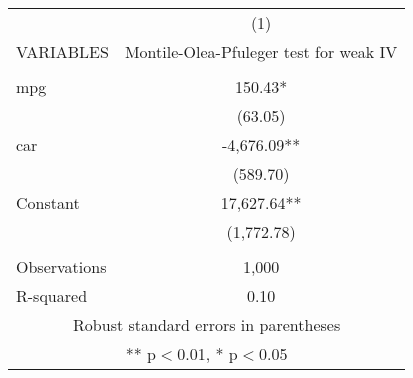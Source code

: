 \begin{tabular}{lc} \hline
 & (1) \\
VARIABLES & Montile-Olea-Pfuleger test for weak IV \\ \hline
 &  \\
mpg & 150.43* \\
 & (63.05) \\
car & -4,676.09** \\
 & (589.70) \\
Constant & 17,627.64** \\
 & (1,772.78) \\
 &  \\
Observations & 1,000 \\
 R-squared & 0.10 \\ \hline
\multicolumn{2}{c}{ Robust standard errors in parentheses} \\
\multicolumn{2}{c}{ ** p$<$0.01, * p$<$0.05} \\
\end{tabular}
